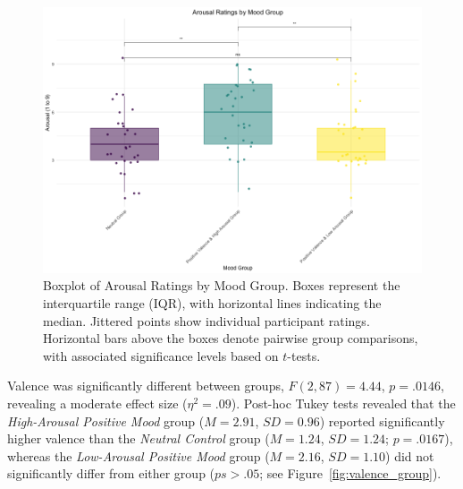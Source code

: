 \documentclass[../MA_Thesis.tex]{subfiles}
\begin{document}
\begin{figure}[H]
  \centering
  \includegraphics[width=\textwidth]{../analysis/results/main_results/mood_induction_check/arousal_by_group.png}
  \caption{Boxplot of Arousal Ratings by Mood Group. Boxes represent the interquartile range (IQR), with horizontal lines indicating the median. Jittered points show individual participant ratings. Horizontal bars above the boxes denote pairwise group comparisons, with associated significance levels based on $t$-tests.}
  \label{fig:arousal_group}
\end{figure}

Valence was significantly different between groups, $F(2, 87) = 4.44$, $p = .0146$, revealing a moderate effect size ($\eta^2 = .09$). Post-hoc Tukey tests revealed that the \textit{High-Arousal Positive Mood} group ($M = 2.91$, $SD = 0.96$) reported significantly higher valence than the \textit{Neutral Control} group ($M = 1.24$, $SD = 1.24$; $p = .0167$), whereas the \textit{Low-Arousal Positive Mood} group ($M = 2.16$, $SD = 1.10$) did not significantly differ from either group ($ps > .05$; see Figure~\ref{fig:valence_group}). 
\end{document}
